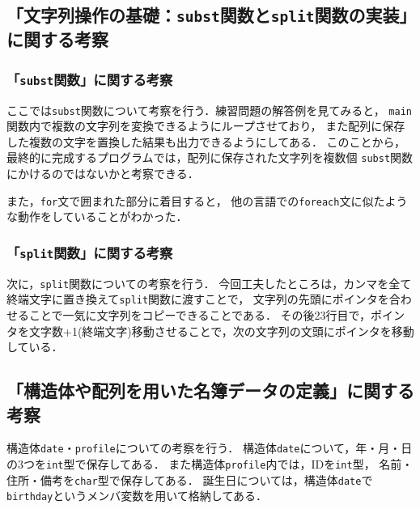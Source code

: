 \documentclass[autodetect-engine,dvi=dvipdfmx,ja=standard,
               a4j,11pt]{bxjsarticle}
\begin{document}
\subsection{「文字列操作の基礎：\texttt{subst}関数と\texttt{split}関数の実装」に関する考察}

\subsubsection{「\texttt{subst}関数」に関する考察}

ここでは\verb|subst|関数について考察を行う．練習問題の解答例を見てみると，
\verb|main|関数内で複数の文字列を変換できるようにループさせており，
また配列に保存した複数の文字を置換した結果も出力できるようにしてある．
このことから，最終的に完成するプログラムでは，配列に保存された文字列を複数個
\verb|subst|関数にかけるのではないかと考察できる．

また，\verb|for|文で囲まれた部分に着目すると，
他の言語での\verb|foreach|文に似たような動作をしていることがわかった．

\subsubsection{「\texttt{split}関数」に関する考察}

次に，\verb|split|関数についての考察を行う．
今回工夫したところは，カンマを全て終端文字に置き換えて\verb|split|関数に渡すことで，
文字列の先頭にポインタを合わせることで一気に文字列をコピーできることである．
その後23行目で，ポインタを文字数+1(終端文字)移動させることで，次の文字列の文頭にポインタを移動している．

\subsection{「構造体や配列を用いた名簿データの定義」に関する考察}

構造体\verb|date|・\verb|profile|についての考察を行う．
構造体\verb|date|について，年・月・日の3つを\verb|int|型で保存してある．
また構造体\verb|profile|内では，IDを\verb|int|型，
名前・住所・備考を\verb|char|型で保存してある．
誕生日については，構造体\verb|date|で\verb|birthday|というメンバ変数を用いて格納してある．
\end{document}
